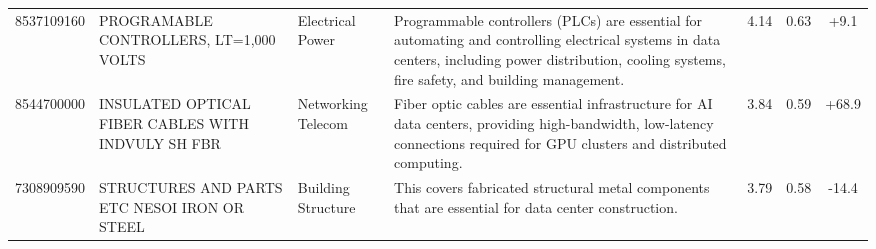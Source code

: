 \begin{landscape}
\begin{table}[htbp]
\begin{tabular}{lp{4cm}lp{6cm}ccc}
8537109160 & {\scriptsize PROGRAMABLE CONTROLLERS, LT=1,000 VOLTS} & Electrical Power & {\scriptsize Programmable controllers (PLCs) are essential for automating and controlling electrical systems in data centers, including power distribution, cooling systems, fire safety, and building management.} & 4.14 & 0.63 & +9.1 \\
8544700000 & {\scriptsize INSULATED OPTICAL FIBER CABLES WITH INDVULY SH FBR} & Networking Telecom & {\scriptsize Fiber optic cables are essential infrastructure for AI data centers, providing high-bandwidth, low-latency connections required for GPU clusters and distributed computing.} & 3.84 & 0.59 & +68.9 \\
7308909590 & {\scriptsize STRUCTURES AND PARTS ETC NESOI IRON OR STEEL} & Building Structure & {\scriptsize This covers fabricated structural metal components that are essential for data center construction.} & 3.79 & 0.58 & -14.4 \\
\bottomrule
\end{tabular}
\end{table}
\end{landscape}
